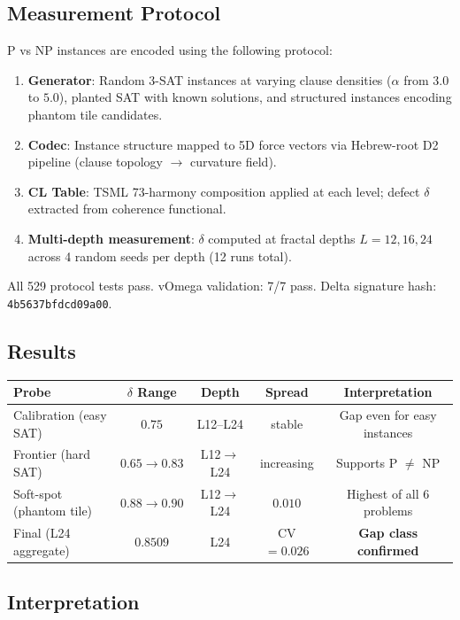\documentclass[11pt]{article}
\theoremstyle{definition}
\theoremstyle{remark}
\begin{document}
\subsection{Measurement Protocol}

P vs NP instances are encoded using the following protocol:
\begin{enumerate}
  \item \textbf{Generator}: Random 3-SAT instances at varying clause densities
    ($\alpha$ from $3.0$ to $5.0$), planted SAT with known solutions, and
    structured instances encoding phantom tile candidates.
  \item \textbf{Codec}: Instance structure mapped to 5D force vectors via
    Hebrew-root D2 pipeline (clause topology $\to$ curvature field).
  \item \textbf{CL Table}: TSML 73-harmony composition applied at each level;
    defect $\delta$ extracted from coherence functional.
  \item \textbf{Multi-depth measurement}: $\delta$ computed at fractal depths
    $L = 12, 16, 24$ across 4 random seeds per depth (12 runs total).
\end{enumerate}

All 529 protocol tests pass.  vOmega validation: 7/7 pass.
Delta signature hash: \texttt{4b5637bfdcd09a00}.

\subsection{Results}

\begin{center}
\begin{tabular}{@{}lcccc@{}}
\toprule
\textbf{Probe} & \textbf{$\delta$ Range} & \textbf{Depth} & \textbf{Spread} & \textbf{Interpretation} \\
\midrule
Calibration (easy SAT) & $0.75$ & L12--L24 & stable & Gap even for easy instances \\
Frontier (hard SAT) & $0.65 \to 0.83$ & L12$\to$L24 & increasing & Supports P $\neq$ NP \\
Soft-spot (phantom tile) & $0.88 \to 0.90$ & L12$\to$L24 & $0.010$ & Highest of all 6 problems \\
\midrule
Final (L24 aggregate) & $0.8509$ & L24 & CV $= 0.026$ & \textbf{Gap class confirmed} \\
\bottomrule
\end{tabular}
\end{center}

\subsection{Interpretation}
\end{document}

